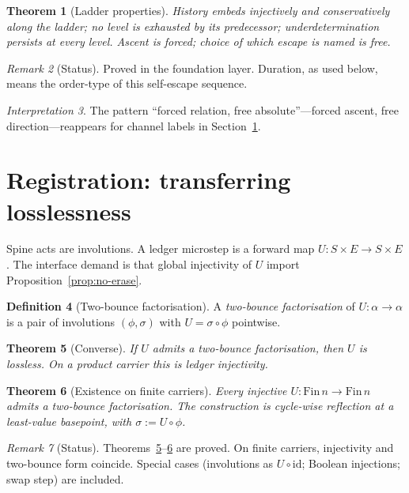 \documentclass[11pt,a4paper]{article}
\theoremstyle{plain}
\newtheorem{theorem}{Theorem}[section]
\theoremstyle{definition}
\newtheorem{definition}[theorem]{Definition}
\theoremstyle{remark}
\newtheorem{remark}[theorem]{Remark}
\newtheorem{interpretation}[theorem]{Interpretation}
\newcommand{\comp}{\circ}
\begin{document}
\begin{theorem}[Ladder properties]
\label{thm:ladder}
History embeds injectively and conservatively along the ladder; no level
is exhausted by its predecessor; underdetermination persists at every
level. Ascent is forced; choice of which escape is named is free.
\end{theorem}

\begin{remark}[Status]
Proved in the foundation layer. Duration, as used below, means the
order-type of this self-escape sequence.
\end{remark}

\begin{interpretation}
\label{int:ladder}
The pattern ``forced relation, free absolute''---forced ascent, free
direction---reappears for channel labels in Section~\ref{sec:reg}.
\end{interpretation}


\section{Registration: transferring losslessness}
\label{sec:reg}

Spine acts are involutions. A ledger microstep is a forward map
$U:S\times E\to S\times E$. The interface demand is that global
injectivity of $U$ import Proposition~\ref{prop:no-erase}.

\begin{definition}[Two-bounce factorisation]
\label{def:twobounce}
A \emph{two-bounce factorisation} of $U:\alpha\to\alpha$ is a pair of
involutions $(\phi,\sigma)$ with $U=\sigma\comp\phi$ pointwise.
\end{definition}

\begin{theorem}[Converse]
\label{thm:converse}
If $U$ admits a two-bounce factorisation, then $U$ is lossless. On a
product carrier this is ledger injectivity.
\end{theorem}

\begin{theorem}[Existence on finite carriers]
\label{thm:exists}
Every injective $U:\mathrm{Fin}\,n\to\mathrm{Fin}\,n$ admits a
two-bounce factorisation. The construction is cycle-wise reflection at a
least-value basepoint, with $\sigma:=U\comp\phi$.
\end{theorem}

\begin{remark}[Status]
Theorems~\ref{thm:converse}--\ref{thm:exists} are proved. On finite
carriers, injectivity and two-bounce form coincide. Special cases
(involutions as $U\comp\mathrm{id}$; Boolean injections; swap step) are
included.
\end{remark}
\end{document}
